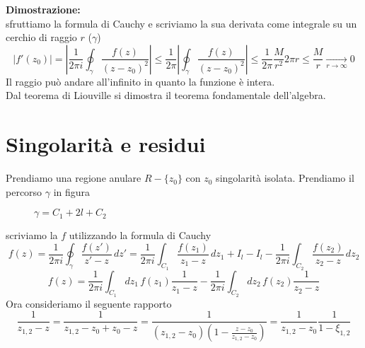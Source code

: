 \hspace{-1.6em}\textbf{Dimostrazione:}\\
sfruttiamo la formula di Cauchy e scriviamo la sua derivata come integrale su un cerchio di raggio $r$ ($\gamma$)
\[|f'(z_0)| = \left|\frac{1}{2\pi i}\oint_\gamma \frac{f(z)}{(z-z_0)^2}\right|\leq \frac{1}{2\pi}\left|\oint_\gamma\frac{f(z)}{(z-z_0)^2}\right|\leq \frac{1}{2\pi}\frac{M}{r^2}2\pi r\leq \frac{M}{r}\xrightarrow[r\to\infty]{}  0\]
Il raggio può andare all'infinito in quanto la funzione è intera.\\
Dal teorema di Liouville si dimostra il teorema fondamentale dell'algebra.
\section{Singolarità e residui}
Prendiamo una regione anulare $R-\{z_0\}$ con $z_0$ singolarità isolata. Prendiamo il percorso $\gamma$ in figura
\begin{figure}[H]
\centering
{}
\caption{$\gamma = C_1+2l+C_2$}\label{percorso}
\end{figure}
scriviamo la $f$ utilizzando la formula di Cauchy
\[f(z) = \frac{1}{2\pi i}\oint_\gamma \frac{f(z')}{z'-z}\,dz' = \frac{1}{2\pi i}\int_{C_1}\frac{f(z_1)}{z_1-z}\,dz_1 + I_l -I_l - \frac{1}{2\pi i}\int_{C_2}\frac{f(z_2)}{z_2-z}\,dz_2\]
\[f(z) =\frac{1}{2\pi i}\int_{C_1}dz_1\,f(z_1)\frac{1}{z_1-z} - \frac{1}{2\pi i}\int_{C_2}dz_2\,f(z_2)\frac{1}{z_2-z} \]
Ora consideriamo il seguente rapporto 
\[\frac{1}{z_{1,2}-z} =\frac{1}{z_{1,2}-z_0+z_0-z} = \frac{1}{(z_{1,2}-z_0)(1-\frac{z-z_0}{z_{1,2}-z_0})} = \frac{1}{z_{1,2}-z_0}\frac{1}{1-\xi_{1,2}} \]
